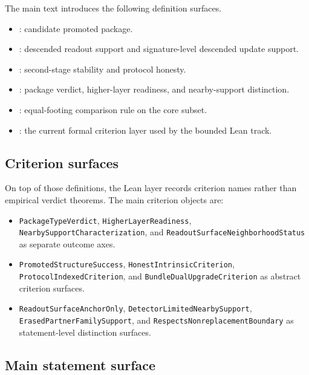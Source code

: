 \documentclass[11pt]{article}
\theoremstyle{definition}
\begin{document}
The main text introduces the following definition surfaces.
\begin{itemize}
\item {}: candidate promoted package.
\item {}: descended readout support and signature-level descended update support.
\item {}: second-stage stability and protocol honesty.
\item {}: package verdict, higher-layer readiness, and nearby-support distinction.
\item {}: equal-footing comparison rule on the core subset.
\item {}: the current formal criterion layer used by the bounded Lean track.
\end{itemize}

\subsection*{Criterion surfaces}

On top of those definitions, the Lean layer records criterion names rather than empirical verdict theorems. The main criterion objects are:
\begin{itemize}
\item \texttt{PackageTypeVerdict}, \texttt{HigherLayerReadiness}, \texttt{NearbySupportCharacterization}, and \texttt{ReadoutSurfaceNeighborhoodStatus} as separate outcome axes.
\item \texttt{PromotedStructureSuccess}, \texttt{HonestIntrinsicCriterion}, \texttt{ProtocolIndexedCriterion}, and \texttt{BundleDualUpgradeCriterion} as abstract criterion surfaces.
\item \texttt{ReadoutSurfaceAnchorOnly}, \texttt{DetectorLimitedNearbySupport}, \texttt{ErasedPartnerFamilySupport}, and \texttt{RespectsNonreplacementBoundary} as statement-level distinction surfaces.
\end{itemize}

\subsection*{Main statement surface}
\end{document}
